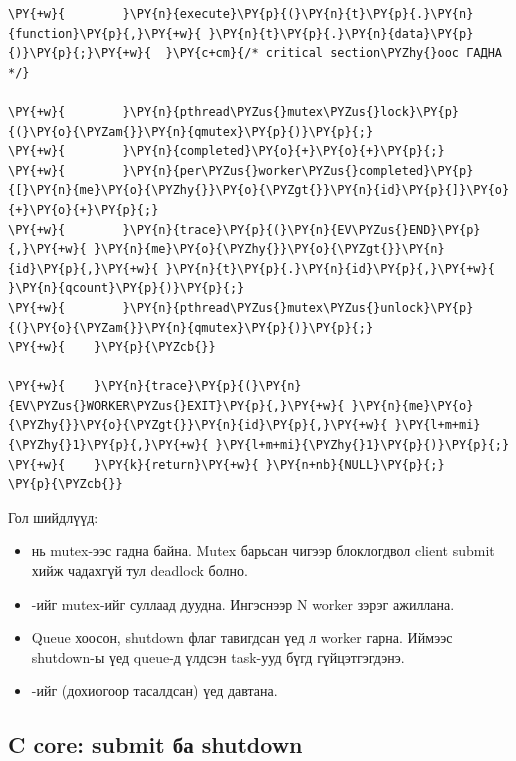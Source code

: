 \documentclass[12pt,a4paper]{article}
\begin{document}
\begin{minipage}{\linewidth}
\begin{Verbatim}[commandchars=\\\{\}]
\PY{+w}{        }\PY{n}{execute}\PY{p}{(}\PY{n}{t}\PY{p}{.}\PY{n}{function}\PY{p}{,}\PY{+w}{ }\PY{n}{t}\PY{p}{.}\PY{n}{data}\PY{p}{)}\PY{p}{;}\PY{+w}{  }\PY{c+cm}{/* critical section\PYZhy{}оос ГАДНА */}

\PY{+w}{        }\PY{n}{pthread\PYZus{}mutex\PYZus{}lock}\PY{p}{(}\PY{o}{\PYZam{}}\PY{n}{qmutex}\PY{p}{)}\PY{p}{;}
\PY{+w}{        }\PY{n}{completed}\PY{o}{+}\PY{o}{+}\PY{p}{;}
\PY{+w}{        }\PY{n}{per\PYZus{}worker\PYZus{}completed}\PY{p}{[}\PY{n}{me}\PY{o}{\PYZhy{}}\PY{o}{\PYZgt{}}\PY{n}{id}\PY{p}{]}\PY{o}{+}\PY{o}{+}\PY{p}{;}
\PY{+w}{        }\PY{n}{trace}\PY{p}{(}\PY{n}{EV\PYZus{}END}\PY{p}{,}\PY{+w}{ }\PY{n}{me}\PY{o}{\PYZhy{}}\PY{o}{\PYZgt{}}\PY{n}{id}\PY{p}{,}\PY{+w}{ }\PY{n}{t}\PY{p}{.}\PY{n}{id}\PY{p}{,}\PY{+w}{ }\PY{n}{qcount}\PY{p}{)}\PY{p}{;}
\PY{+w}{        }\PY{n}{pthread\PYZus{}mutex\PYZus{}unlock}\PY{p}{(}\PY{o}{\PYZam{}}\PY{n}{qmutex}\PY{p}{)}\PY{p}{;}
\PY{+w}{    }\PY{p}{\PYZcb{}}

\PY{+w}{    }\PY{n}{trace}\PY{p}{(}\PY{n}{EV\PYZus{}WORKER\PYZus{}EXIT}\PY{p}{,}\PY{+w}{ }\PY{n}{me}\PY{o}{\PYZhy{}}\PY{o}{\PYZgt{}}\PY{n}{id}\PY{p}{,}\PY{+w}{ }\PY{l+m+mi}{\PYZhy{}1}\PY{p}{,}\PY{+w}{ }\PY{l+m+mi}{\PYZhy{}1}\PY{p}{)}\PY{p}{;}
\PY{+w}{    }\PY{k}{return}\PY{+w}{ }\PY{n+nb}{NULL}\PY{p}{;}
\PY{p}{\PYZcb{}}
\end{Verbatim}
\end{minipage}

Гол шийдлүүд:

\begin{itemize}
  \item {} нь mutex-ээс гадна байна. Mutex барьсан чигээр блоклогдвол client submit хийж чадахгүй тул deadlock болно.
  \item {}-ийг mutex-ийг суллаад дуудна. Ингэснээр N worker зэрэг ажиллана.
  \item Queue хоосон, shutdown флаг тавигдсан үед л worker гарна. Иймээс shutdown-ы үед queue-д үлдсэн task-ууд бүгд гүйцэтгэгдэнэ.
  \item {}-ийг  (дохиогоор тасалдсан) үед давтана.
\end{itemize}

\subsection{C core: submit ба shutdown}
\end{document}
